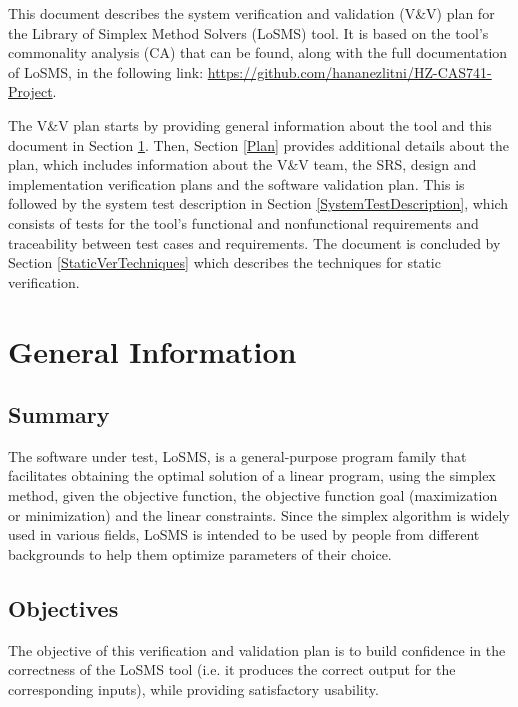 \documentclass[12pt, titlepage]{article}
\newcommand{\famname}{LoSMS} %
\begin{document}
\listoffigures

\newpage


This document describes the system verification and validation (V\&V) plan for 
the Library of Simplex Method Solvers (\famname{}) tool. It is based on the 
tool's commonality analysis (CA) that can be found, along with the full 
documentation of \famname{}, in the following link:  
\url{https://github.com/hananezlitni/HZ-CAS741-Project}.

The V\&V plan starts by providing general information about the tool and this 
document in Section \ref{GeneralInfo}. Then, Section \ref{Plan} provides 
additional details about the plan, which includes information about the V\&V 
team, the SRS, design and implementation verification plans and the software 
validation plan. This is followed by the system test description in Section 
\ref{SystemTestDescription}, which consists of tests for the tool's functional 
and nonfunctional requirements and traceability between test cases and 
requirements. The document is concluded by Section \ref{StaticVerTechniques} 
which describes the techniques for static verification.

\section{General Information} \label{GeneralInfo}

\subsection{Summary}

The software under test, \famname{}, is a general-purpose program family that 
facilitates obtaining the optimal solution of a linear program, using the 
simplex method, given the objective function, the objective function goal 
(maximization or minimization) and the linear constraints. Since the simplex 
algorithm is widely used in various fields, \famname{} is intended to be used 
by people from different backgrounds to help them optimize parameters of their 
choice.

\subsection{Objectives}

The objective of this verification and validation plan is to build confidence 
in the correctness of the \famname{} tool (i.e. it produces the correct output 
for the corresponding inputs), while providing satisfactory usability.
\end{document}
